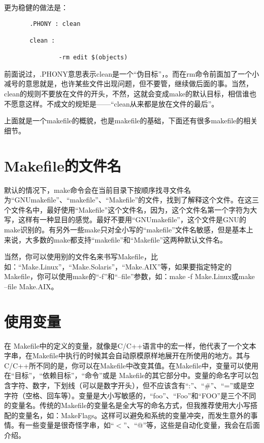 \documentclass[]{book}
\begin{document}
更为稳健的做法是：

\begin{verbatim}
       .PHONY : clean

       clean :

               -rm edit $(objects)
\end{verbatim}

前面说过，.PHONY意思表示clean是一个``伪目标''，。而在rm命令前面加了一个小减号的意思就是，也许某些文件出现问题，但不要管，继续做后面的事。当然，clean的规则不要放在文件的开头，不然，这就会变成make的默认目标，相信谁也不愿意这样。不成文的规矩是------``clean从来都是放在文件的最后''。

上面就是一个makefile的概貌，也是makefile的基础，下面还有很多makefile的相关细节。

\hypertarget{makefileux7684ux6587ux4ef6ux540d}{%
\section{Makefile的文件名}\label{makefileux7684ux6587ux4ef6ux540d}}

默认的情况下，make命令会在当前目录下按顺序找寻文件名为``GNUmakefile''、``makefile''、``Makefile''的文件，找到了解释这个文件。在这三个文件名中，最好使用``Makefile''这个文件名，因为，这个文件名第一个字符为大写，这样有一种显目的感觉。最好不要用``GNUmakefile''，这个文件是GNU的make识别的。有另外一些make只对全小写的``makefile''文件名敏感，但是基本上来说，大多数的make都支持``makefile''和``Makefile''这两种默认文件名。

当然，你可以使用别的文件名来书写Makefile，比如：``Make.Linux''，``Make.Solaris''，``Make.AIX''等，如果要指定特定的Makefile，你可以使用make的``-f''和``--file''参数，如：make -f Make.Linux或make --file Make.AIX。

\hypertarget{ux4f7fux7528ux53d8ux91cf}{%
\section{使用变量}\label{ux4f7fux7528ux53d8ux91cf}}

在 Makefile中的定义的变量，就像是C/C++语言中的宏一样，他代表了一个文本字串，在Makefile中执行的时候其会自动原模原样地展开在所使用的地方。其与C/C++所不同的是，你可以在Makefile中改变其值。在Makefile中，变量可以使用在``目标''，``依赖目标''，``命令''或是 Makefile的其它部分中。变量的命名字可以包含字符、数字，下划线（可以是数字开头），但不应该含有``:''、``\#''、``=''或是空字符（空格、回车等）。变量是大小写敏感的，``foo''、``Foo''和``FOO''是三个不同的变量名。传统的Makefile的变量名是全大写的命名方式，但我推荐使用大小写搭配的变量名，如：MakeFlags。这样可以避免和系统的变量冲突，而发生意外的事情。有一些变量是很奇怪字串，如``\(<”、“\)@''等，这些是自动化变量，我会在后面介绍。
\end{document}
